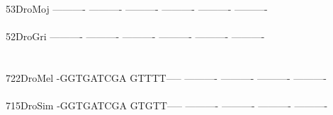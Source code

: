 \documentclass[11pt,twoside,reqno,a4paper]{article}
\begin{document}
{53\hspace*{3\charwidth}DroMoj	----------	----------	----------	----------	----------	----------	\\
\hspace*{5\charwidth}\hspace*{7\charwidth}\hspace*{1\charwidth}\hspace*{1\charwidth}\hspace*{1\charwidth}\hspace*{1\charwidth}\hspace*{1\charwidth}\hspace*{1\charwidth}\\
52\hspace*{3\charwidth}DroGri	----------	----------	----------	----------	----------	----------	\\
\hspace*{5\charwidth}\hspace*{7\charwidth}\hspace*{1\charwidth}\hspace*{1\charwidth}\hspace*{1\charwidth}\hspace*{1\charwidth}\hspace*{1\charwidth}\hspace*{1\charwidth}\\
\\
722\hspace*{2\charwidth}DroMel	-GGTGATCGA	GTTTT-----	----------	----------	----------	----------	\\
\hspace*{5\charwidth}\hspace*{7\charwidth}\hspace*{1\charwidth}\hspace*{1\charwidth}\hspace*{1\charwidth}\hspace*{1\charwidth}\hspace*{1\charwidth}\hspace*{1\charwidth}\\
715\hspace*{2\charwidth}DroSim	-GGTGATCGA	GTGTT-----	----------	----------	----------	----------	\\
\hspace*{5\charwidth}\hspace*{7\charwidth}\hspace*{1\charwidth}\hspace*{1\charwidth}\hspace*{1\charwidth}\hspace*{1\charwidth}\hspace*{1\charwidth}\hspace*{1\charwidth}\\
}
\end{document}
